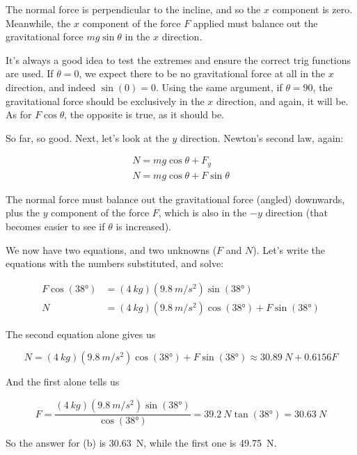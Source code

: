 \documentclass[8.01x]{subfiles}
\begin{document}
The normal force is perpendicular to the incline, and so the $x$ component is zero. Meanwhile, the $x$ component of the force $F$ applied must balance out the gravitational force $m g \sin \theta$ in the $x$ direction.

It's always a good idea to test the extremes and ensure the correct trig functions are used. If $\theta = 0$, we expect there to be no gravitational force at all in the $x$ direction, and indeed $\sin(0) = 0$. Using the same argument, if $\theta = 90$, the gravitational force should be exclusively in the $x$ direction, and again, it will be. As for $F \cos \theta$, the opposite is true, as it should be.

So far, so good. Next, let's look at the $y$ direction. Newton's second law, again:

\begin{align}
N = m g \cos \theta + F_y\\
N = m g \cos \theta + F \sin \theta
\end{align}

The normal force must balance out the gravitational force (angled) downwards, plus the $y$ component of the force $F$, which is also in the $-y$ direction (that becomes easier to see if $\theta$ is increased).

We now have two equations, and two unknowns ($F$ and $N$). Let's write the equations with the numbers substituted, and solve:

\begin{align}
F \cos(\ang{38}) &= (\SI{4}{kg})(\SI{9.8}{m/s^2}) \sin(\ang{38})\\
N &= (\SI{4}{kg})(\SI{9.8}{m/s^2}) \cos(\ang{38}) + F \sin(\ang{38})
\end{align}

The second equation alone gives us

\begin{equation}
N = (\SI{4}{kg})(\SI{9.8}{m/s^2}) \cos(\ang{38}) + F \sin(\ang{38}) \approx \SI{30.89}{N} + 0.6156 F
\end{equation}

And the first alone tells us

\begin{equation}
F = \frac{(\SI{4}{kg})(\SI{9.8}{m/s^2}) \sin(\ang{38})}{\cos(\ang{38})} = \SI{39.2}{N} \tan(\ang{38}) = \SI{30.63}{N}
\end{equation}

So the answer for (b) is \SI{30.63}{N}, while the first one is \SI{49.75}{N}.
\end{document}
